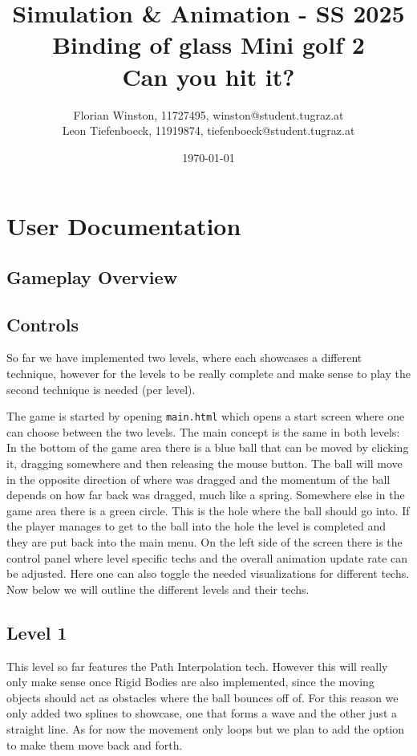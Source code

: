 \documentclass{article}
\title{	
	\large Simulation \& Animation - SS 2025\\
	\Huge{Binding of glass Mini golf 2}\\
	\huge{Can you hit it?}
}
\author{\parbox{\textwidth}{\centering
	Florian Winston, 11727495, winston@student.tugraz.at\\%
	Leon Tiefenboeck, 11919874, tiefenboeck@student.tugraz.at\\%
}}
\date{\today}
\begin{document}
\maketitle

\section{User Documentation}

\subsection{Gameplay Overview}

\subsection{Controls}

So far we have implemented two levels, where each showcases 
a different technique, however for the levels to be really complete and make sense to play the 
second technique is needed (per level). 

The game is started by opening \texttt{main.html} which opens a 
start screen where one can choose between the two levels. 
The main concept is the same in both levels: 
In the bottom of the game area there is a blue ball that can be moved 
by clicking it, dragging somewhere and then releasing the mouse button. 
The ball will move in the opposite direction of where was dragged and the momentum of the 
ball depends on how far back was dragged, much like a spring. 
Somewhere else in the game area there is a green circle. This is the hole where 
the ball should go into. If the player manages to get to the ball into the hole the level is completed 
and they are put back into the main menu. 
On the left side of the screen there is the control panel where level specific techs 
and the overall animation update rate can be adjusted. Here one can also toggle the needed visualizations 
for different techs. Now below we will outline the different levels and their techs. 

\subsection{Level 1}

This level so far features the Path Interpolation tech. However this will really only make sense 
once Rigid Bodies are also implemented, since the moving objects should act as obstacles where the 
ball bounces off of. For this reason we only added two splines to showcase, one that forms a wave and the other
just a straight line. As for now the movement only loops but we plan to add the option to 
make them move back and forth. 
\end{document}

